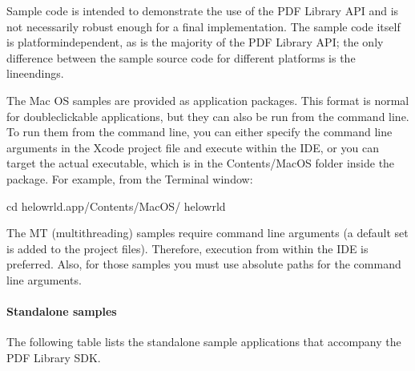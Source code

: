 \documentclass[letterpaper,12pt,english,openany,oneside]{sphinxmanual}
\begin{document}
Sample code is intended to demonstrate the use of the PDF Library API and is not necessarily robust enough for a final implementation. The sample code itself is platform\sphinxhyphen{}independent, as is the majority of the PDF Library API; the only difference between the sample source code for different platforms is the line\sphinxhyphen{}endings.

The Mac OS samples are provided as application packages. This format is normal for double\sphinxhyphen{}clickable applications, but they can also be run from the command line. To run them from the command line, you can either specify the command line arguments in the Xcode project file and execute within the IDE, or you can target the actual executable, which is in the Contents/MacOS folder inside the package. For example, from the Terminal window:

\begin{sphinxVerbatim}[commandchars=\\\{\}]
\PYGZdl{} cd helowrld.app/Contents/MacOS/
\PYGZdl{} helowrld
\end{sphinxVerbatim}

The MT (multi\sphinxhyphen{}threading) samples require command line arguments (a default set is added to the project files). Therefore, execution from within the IDE is preferred. Also, for those samples you must use absolute paths for the command line arguments.


\paragraph{Stand\sphinxhyphen{}alone samples}
\label{\detokenize{Plugins_CreatingSimplePlug:stand-alone-samples}}
The following table lists the stand\sphinxhyphen{}alone sample applications that accompany the PDF Library SDK.
\end{document}
